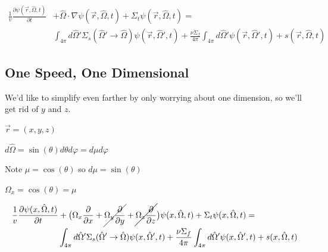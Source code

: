 \documentclass[12pt]{article}
\newcommand{\vOmega}{\ensuremath{\hat{\Omega}}}
\begin{document}
\begin{align*}
\frac{1}{v}\frac{\partial \psi(\vec{r}, \vOmega, t)}{\partial t} &+ 
\vOmega \cdot \nabla \psi(\vec{r}, \vOmega, t) +
\Sigma_t \psi(\vec{r}, \vOmega, t) = \nonumber\\
%
& \int_{4\pi} d\vOmega' \Sigma_s(\vOmega' \rightarrow \vOmega) \psi(\vec{r}, \vOmega', t)  
+ \frac{\nu \Sigma_f}{4\pi} \int_{4\pi} d\vOmega' \psi(\vec{r},  \vOmega', t) 
+ s(\vec{r}, \vOmega, t) 
\end{align*}
%


\subsection*{One Speed, One Dimensional}

We'd like to simplify even farther by only worrying about one dimension, so we'll get rid of $y$ and $z$.

$\vec{r} = (x, y, z)$

$d\vOmega = \sin(\theta) d\theta	d\varphi = d\mu d\varphi$

Note $\mu = \cos(\theta)$ so $d\mu = \sin(\theta)$

$\Omega_x = \cos(\theta) = \mu$

\begin{align*}
\frac{1}{v}\frac{\partial \psi(x, \vOmega, t)}{\partial t} &+ 
\bigl(\Omega_x \frac{\partial}{\partial x} + \cancel{\Omega_y \frac{\partial}{\partial y}} + \cancel{\Omega_z \frac{\partial}{\partial z}} \bigr)\psi(x, \vOmega, t) +
\Sigma_t \psi(x, \vOmega, t) = \nonumber\\
%
& \int_{4\pi} d\vOmega' \Sigma_s(\vOmega' \rightarrow \vOmega) \psi(x, \vOmega', t)  + 
\frac{\nu \Sigma_f}{4\pi} \int_{4\pi} d\vOmega' \psi(x,  \vOmega', t) + s(x, \vOmega, t)%
\end{align*}
\end{document}
